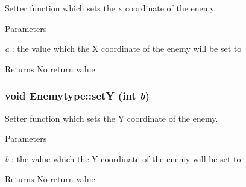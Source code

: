 Setter function which sets the x coordinate of the enemy. 
\begin{DoxyParams}{Parameters}
\item[{\em a}]: the value which the X coordinate of the enemy will be set to \end{DoxyParams}
\begin{DoxyReturn}{Returns}
No return value 
\end{DoxyReturn}
\hypertarget{classEnemytype_a873a843e7f6eba7dd8ef41d4041661f6}{
\subsubsection[{setY}]{\setlength{\rightskip}{0pt plus 5cm}void Enemytype::setY (int {\em b})}}
\label{classEnemytype_a873a843e7f6eba7dd8ef41d4041661f6}


Setter function which sets the Y coordinate of the enemy. 
\begin{DoxyParams}{Parameters}
\item[{\em b}]: the value which the Y coordinate of the enemy will be set to \end{DoxyParams}
\begin{DoxyReturn}{Returns}
No return value 
\end{DoxyReturn}


